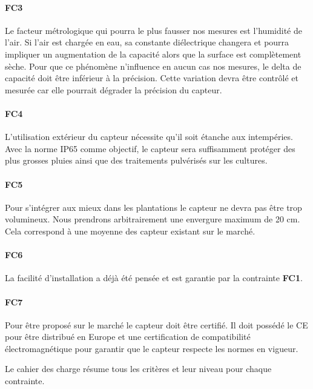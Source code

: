 \paragraph{FC3}
Le facteur métrologique qui pourra le plus fausser nos mesures est l'humidité de l'air. Si l'air est chargée en eau, sa constante diélectrique changera et pourra impliquer un augmentation de la capacité alors que la surface est complètement sèche. Pour que ce phénomène n’influence en aucun cas nos mesures, le delta de capacité doit être inférieur à la précision. Cette variation devra être contrôlé et mesurée car elle pourrait dégrader la précision du capteur.   

\paragraph{FC4}
L'utilisation extérieur du capteur nécessite qu'il soit étanche aux intempéries. Avec la norme IP65 comme objectif, le capteur sera suffisamment protéger des plus grosses pluies ainsi que des traitements pulvérisés sur les cultures.    

\paragraph{FC5}
Pour s’intégrer aux mieux dans les plantations le capteur ne devra pas être trop volumineux. Nous prendrons arbitrairement une envergure maximum de 20 cm. Cela correspond à une moyenne des capteur existant sur le marché.

\paragraph{FC6}
La facilité d'installation a déjà été pensée et est garantie par la contrainte \textbf{FC1}.

\paragraph{FC7}
Pour être proposé sur le marché le capteur doit être certifié. Il doit possédé le CE pour être distribué en Europe et une certification de compatibilité électromagnétique pour garantir que le capteur respecte les normes en vigueur.  

\bigskip
Le cahier des charge résume tous les critères et leur niveau pour chaque contrainte.

